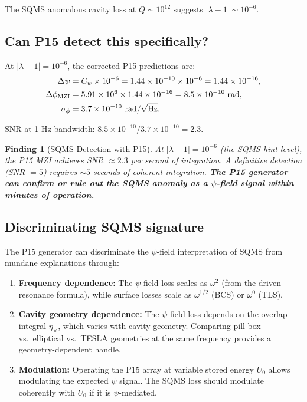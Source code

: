 \documentclass[11pt]{article}
\newtheorem{finding}{Finding}
\newcommand{\ee}[1]{\times 10^{#1}}
\begin{document}
The SQMS anomalous cavity loss at $Q \sim 10^{12}$ suggests $|\lambda-1| \sim 10^{-6}$.

\subsection{Can P15 detect this specifically?}

At $|\lambda-1| = 10^{-6}$, the corrected P15 predictions are:
\begin{align}
\Delta\psi &= C_\psi \times 10^{-6} = 1.44\ee{-10} \times 10^{-6} = 1.44\ee{-16}, \\
\Delta\phi_{\rm MZI} &= 5.91\ee{6} \times 1.44\ee{-16} = 8.5\ee{-10}\text{ rad}, \\
\sigma_\phi &= 3.7\ee{-10}\text{ rad}/\sqrt{\text{Hz}}.
\end{align}

SNR at 1 Hz bandwidth: $8.5\ee{-10}/3.7\ee{-10} = 2.3$.

\begin{finding}[SQMS Detection with P15]
At $|\lambda-1| = 10^{-6}$ (the SQMS hint level), the P15 MZI achieves SNR $\approx 2.3$ per second of integration. A definitive detection (SNR $= 5$) requires $\sim 5$ seconds of coherent integration. \textbf{The P15 generator can confirm or rule out the SQMS anomaly as a $\psi$-field signal within minutes of operation.}
\end{finding}

\subsection{Discriminating SQMS signature}

The P15 generator can discriminate the $\psi$-field interpretation of SQMS from mundane explanations through:
\begin{enumerate}
\item \textbf{Frequency dependence:} The $\psi$-field loss scales as $\omega^2$ (from the driven resonance formula), while surface losses scale as $\omega^{1/2}$ (BCS) or $\omega^0$ (TLS).
\item \textbf{Cavity geometry dependence:} The $\psi$-field loss depends on the overlap integral $\eta_\times$, which varies with cavity geometry. Comparing pill-box vs.\ elliptical vs.\ TESLA geometries at the same frequency provides a geometry-dependent handle.
\item \textbf{Modulation:} Operating the P15 array at variable stored energy $U_0$ allows modulating the expected $\psi$ signal. The SQMS loss should modulate coherently with $U_0$ if it is $\psi$-mediated.
\end{enumerate}
\end{document}
